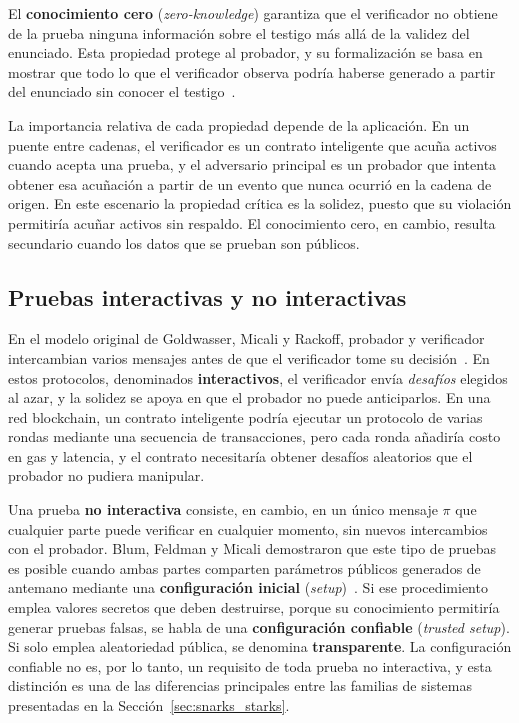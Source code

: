 El \textbf{conocimiento cero} (\textit{zero-knowledge}) garantiza que el verificador no obtiene
de la prueba ninguna información sobre el testigo más allá de la validez del enunciado. Esta
propiedad protege al probador, y su formalización se basa en mostrar que todo lo que el
verificador observa podría haberse generado a partir del enunciado sin conocer el
testigo~\cite{goldwasser1989knowledge}.

La importancia relativa de cada propiedad depende de la aplicación. En un puente entre cadenas,
el verificador es un contrato inteligente que acuña activos cuando acepta una prueba, y el
adversario principal es un probador que intenta obtener esa acuñación a partir de un evento que
nunca ocurrió en la cadena de origen. En este escenario la propiedad crítica es la solidez,
puesto que su violación permitiría acuñar activos sin respaldo. El conocimiento cero, en cambio,
resulta secundario cuando los datos que se prueban son públicos.

\subsection{Pruebas interactivas y no interactivas}
\label{sec:interactivas}

En el modelo original de Goldwasser, Micali y Rackoff, probador y verificador intercambian
varios mensajes antes de que el verificador tome su decisión~\cite{goldwasser1989knowledge}. En
estos protocolos, denominados \textbf{interactivos}, el verificador envía \textit{desafíos}
elegidos al azar, y la solidez se apoya en que el probador no puede anticiparlos. En una red
blockchain, un contrato inteligente podría ejecutar un protocolo de varias rondas mediante una
secuencia de transacciones, pero cada ronda añadiría costo en gas y latencia, y el contrato
necesitaría obtener desafíos aleatorios que el probador no pudiera manipular.

Una prueba \textbf{no interactiva} consiste, en cambio, en un único mensaje $\pi$ que cualquier
parte puede verificar en cualquier momento, sin nuevos intercambios con el probador. Blum,
Feldman y Micali demostraron que este tipo de pruebas es posible cuando ambas partes comparten
parámetros públicos generados de antemano mediante una \textbf{configuración inicial}
(\textit{setup})~\cite{blum1988noninteractive}. Si ese procedimiento emplea valores secretos que
deben destruirse, porque su conocimiento permitiría generar pruebas falsas, se habla de una
\textbf{configuración confiable} (\textit{trusted setup}). Si solo emplea aleatoriedad pública,
se denomina \textbf{transparente}. La configuración confiable no es, por lo tanto, un requisito
de toda prueba no interactiva, y esta distinción es una de las diferencias principales entre las
familias de sistemas presentadas en la Sección~\ref{sec:snarks_starks}.

